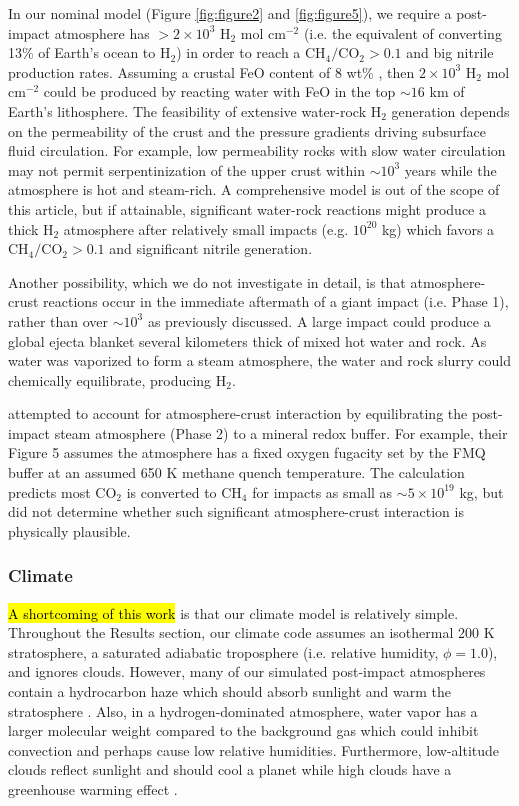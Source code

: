 In our nominal model (Figure \ref{fig:figure2} and \ref{fig:figure5}), we require a post-impact atmosphere has $> 2 \times 10^3$ H$_2$ mol cm$^{-2}$ (i.e. the equivalent of converting 13\% of Earth's ocean to H$_2$) in order to reach a $\mathrm{CH_4}/\mathrm{CO_2} > 0.1$ and big nitrile production rates. Assuming a crustal FeO content of 8 wt\% \citep{Takahashi_1986}, then $2 \times 10^3$ H$_2$ mol cm$^{-2}$ could be produced by reacting water with FeO in the top $\sim 16$ km of Earth's lithosphere. The feasibility of extensive water-rock H$_2$ generation depends on the permeability of the crust and the pressure gradients driving subsurface fluid circulation. For example, low permeability rocks with slow water circulation may not permit serpentinization of the upper crust within $\sim 10^3$ years while the atmosphere is hot and steam-rich. A comprehensive model is out of the scope of this article, but if attainable, significant water-rock reactions might produce a thick H$_2$ atmosphere after relatively small impacts (e.g. $10^{20}$ kg) which favors a $\mathrm{CH_4}/\mathrm{CO_2} > 0.1$ and significant nitrile generation. 

Another possibility, which we do not investigate in detail, is that atmosphere-crust reactions occur in the immediate aftermath of a giant impact (i.e. Phase 1), rather than over $\sim 10^3$ as previously discussed. A large impact could produce a global ejecta blanket several kilometers thick of mixed hot water and rock. As water was vaporized to form a steam atmosphere, the water and rock slurry could chemically equilibrate, producing H$_2$.

\citet{Zahnle_2020} attempted to account for atmosphere-crust interaction by equilibrating the post-impact steam atmosphere (Phase 2) to a mineral redox buffer. For example, their Figure 5 assumes the atmosphere has a fixed oxygen fugacity set by the FMQ buffer at an assumed 650 K methane quench temperature. The calculation predicts most CO$_2$ is converted to CH$_4$ for impacts as small as $\sim 5 \times 10^{19}$ kg, but \citet{Zahnle_2020} did not determine whether such significant atmosphere-crust interaction is physically plausible.

\subsubsection{Climate} \label{sec:climate_uncertainty}

\hl{A shortcoming of this work} is that our climate model is relatively simple. Throughout the Results section, our climate code assumes an isothermal 200 K stratosphere, a saturated adiabatic troposphere (i.e. relative humidity, $\phi = 1.0$), and ignores clouds. However, many of our simulated post-impact atmospheres contain a hydrocarbon haze which should absorb sunlight and warm the stratosphere \citep{Arney_2016}. Also, in a hydrogen-dominated atmosphere, water vapor has a larger molecular weight compared to the background gas which could inhibit convection \citep{Leconte_2017} and perhaps cause low relative humidities. Furthermore, low-altitude clouds reflect sunlight and should cool a planet while high clouds have a greenhouse warming effect \citep{Goldblatt_2011}.

